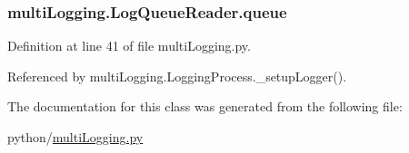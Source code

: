 \subsubsection[{queue}]{\setlength{\rightskip}{0pt plus 5cm}multi\-Logging.\-Log\-Queue\-Reader.\-queue}\label{classmultiLogging_1_1LogQueueReader_ac9211d0e789159bb716ef710f6c35b21}


Definition at line 41 of file multi\-Logging.\-py.



Referenced by multi\-Logging.\-Logging\-Process.\-\_\-setup\-Logger().



The documentation for this class was generated from the following file\-:\begin{DoxyCompactItemize}
\item 
python/\hyperlink{multiLogging_8py}{multi\-Logging.\-py}\end{DoxyCompactItemize}
